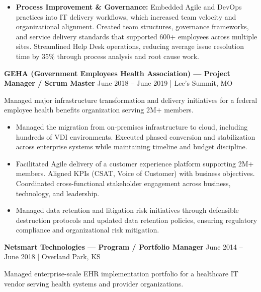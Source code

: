 \documentclass[10pt,letterpaper]{article}
\begin{document}
\begin{itemize}
\item \textbf{Process Improvement \& Governance:} Embedded Agile and DevOps practices into IT delivery workflows, which increased team velocity and organizational alignment. Created team structures, governance frameworks, and service delivery standards that supported 600+ employees across multiple sites. Streamlined Help Desk operations, reducing average issue resolution time by 35\% through process analysis and root cause work.
\end{itemize}

\vspace{6pt}

\textbf{GEHA (Government Employees Health Association) --- Project Manager / Scrum Master}
\newline
June 2018 -- June 2019 | Lee's Summit, MO

Managed major infrastructure transformation and delivery initiatives for a federal employee health benefits organization serving 2M+ members.

\begin{itemize}
\item Managed the migration from on-premises infrastructure to cloud, including hundreds of VDI environments. Executed phased conversion and stabilization across enterprise systems while maintaining timeline and budget discipline.

\item Facilitated Agile delivery of a customer experience platform supporting 2M+ members. Aligned KPIs (CSAT, Voice of Customer) with business objectives. Coordinated cross-functional stakeholder engagement across business, technology, and leadership.

\item Managed data retention and litigation risk initiatives through defensible destruction protocols and updated data retention policies, ensuring regulatory compliance and organizational risk mitigation.
\end{itemize}

\vspace{6pt}

\textbf{Netsmart Technologies --- Program / Portfolio Manager}
\newline
June 2014 -- June 2018 | Overland Park, KS

Managed enterprise-scale EHR implementation portfolio for a healthcare IT vendor serving health systems and provider organizations.
\end{document}
